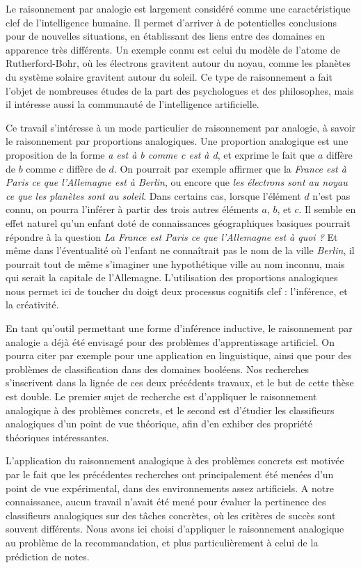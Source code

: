 Le raisonnement par analogie est largement considéré comme une caractéristique
clef de l'intelligence humaine. Il permet d'arriver à de potentielles
conclusions pour de nouvelles situations, en établissant des liens entre des
domaines en apparence très différents. Un exemple connu  est celui du modèle de
l'atome de Rutherford-Bohr, où les électrons gravitent autour du noyau, comme
les planètes du système solaire gravitent autour du soleil. Ce type de
raisonnement a fait l'objet de nombreuses études de la part des psychologues et
des philosophes, mais il intéresse aussi la communauté de l'intelligence
artificielle.

Ce travail s'intéresse à un mode particulier de raisonnement par analogie, à
savoir le raisonnement par proportions analogiques. Une proportion analogique
est une proposition de la forme \textit{a est à b comme c est à d}, et exprime
le fait que $a$ diffère de $b$ comme $c$ diffère de $d$. On pourrait par
exemple affirmer que la \textit{France est à Paris ce que l'Allemagne est à
Berlin}, ou encore que \textit{les électrons sont au noyau ce que les planètes
sont au soleil}. Dans certains cas, lorsque l'élément $d$ n'est pas connu, on
pourra l'inférer à partir des trois autres éléments $a$, $b$, et $c$. Il semble
en effet naturel qu'un enfant doté  de connaissances géographiques basiques
pourrait répondre à la question \textit{La France est Paris ce que l'Allemagne
est à quoi ?} Et même dans l'éventualité où l'enfant ne connaîtrait pas le nom
de la ville \textit{Berlin}, il pourrait tout de même s'imaginer une
hypothétique ville au nom inconnu, mais qui serait la capitale de l'Allemagne.
L'utilisation des proportions analogiques nous permet ici de toucher du doigt
deux processus cognitifs clef : l'inférence, et la créativité.

En tant qu'outil permettant une forme d'inférence inductive, le raisonnement
par analogie a déjà été envisagé pour des problèmes d'apprentissage artificiel.
On pourra citer par exemple \cite{StrYvoCNLL05} pour une application en
linguistique, ainsi que \cite{BayMicDelIJCAI07} pour des problèmes de
classification dans des domaines booléens. Nos recherches s'inscrivent
dans la lignée de ces deux précédents travaux, et le but de cette thèse est
double. Le premier sujet de recherche est d'appliquer le raisonnement
analogique à des problèmes concrets, et le second est d'étudier les classifieurs
analogiques d'un point de vue théorique, afin d'en exhiber des propriété
théoriques intéressantes.

L'application du raisonnement analogique à des problèmes concrets est motivée
par le fait que les précédentes recherches ont principalement été menées d'un
point de vue expérimental, dans des environnements assez artificiels. A notre
connaissance, aucun travail n'avait été mené pour évaluer la pertinence des
classifieurs analogiques sur des tâches concrètes, où les critères de succès
sont souvent différents. Nous avons ici choisi d'appliquer le raisonnement
analogique au problème de la recommandation, et plus particulièrement à celui
de la prédiction de notes.

